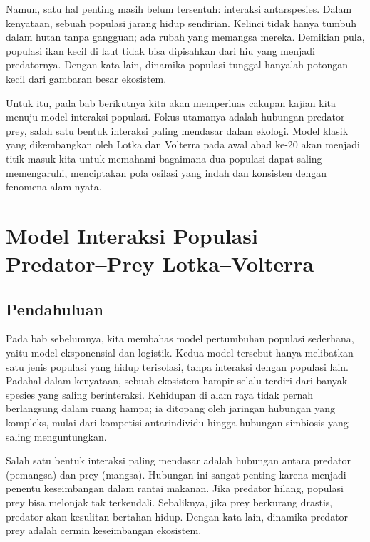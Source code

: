 \documentclass{bukumjh}
\begin{document}
Namun, satu hal penting masih belum tersentuh: {\jsg interaksi antarspesies}. Dalam kenyataan, sebuah populasi jarang hidup sendirian. Kelinci tidak hanya tumbuh dalam hutan tanpa gangguan; ada rubah yang memangsa mereka. Demikian pula, populasi ikan kecil di laut tidak bisa dipisahkan dari hiu yang menjadi predatornya. Dengan kata lain, dinamika populasi tunggal hanyalah potongan kecil dari gambaran besar ekosistem.

Untuk itu, pada bab berikutnya kita akan memperluas cakupan kajian kita menuju {\jsg model interaksi populasi}. Fokus utamanya adalah hubungan predator–prey, salah satu bentuk interaksi paling mendasar dalam ekologi. Model klasik yang dikembangkan oleh Lotka dan Volterra pada awal abad ke-20 akan menjadi titik masuk kita untuk memahami bagaimana dua populasi dapat saling memengaruhi, menciptakan pola osilasi yang indah dan konsisten dengan fenomena alam nyata.



\chapter{Model Interaksi Populasi \\ Predator–Prey Lotka–Volterra}

\section{Pendahuluan}

Pada bab sebelumnya, kita membahas model pertumbuhan populasi sederhana, yaitu model eksponensial dan logistik. Kedua model tersebut hanya melibatkan satu jenis populasi yang hidup terisolasi, tanpa interaksi dengan populasi lain. Padahal dalam kenyataan, sebuah ekosistem hampir selalu terdiri dari banyak spesies yang saling berinteraksi. Kehidupan di alam raya tidak pernah berlangsung dalam ruang hampa; ia ditopang oleh jaringan hubungan yang kompleks, mulai dari kompetisi antarindividu hingga hubungan simbiosis yang saling menguntungkan.

Salah satu bentuk interaksi paling mendasar adalah hubungan antara {\jsg predator} (pemangsa) dan {\jsg prey} (mangsa). Hubungan ini sangat penting karena menjadi penentu keseimbangan dalam rantai makanan. Jika predator hilang, populasi prey bisa melonjak tak terkendali. Sebaliknya, jika prey berkurang drastis, predator akan kesulitan bertahan hidup. Dengan kata lain, dinamika predator–prey adalah cermin keseimbangan ekosistem.
\end{document}
